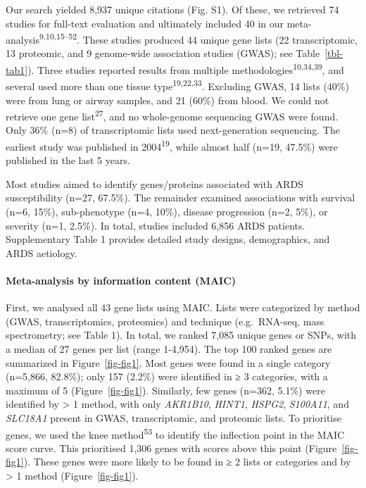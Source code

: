 \documentclass[
  11,
  a4paper,
]{article}
\let\oldparagraph\paragraph
\renewcommand{\paragraph}[1]{\oldparagraph{#1}\mbox{}}
\begin{document}
Our search yielded 8,937 unique citations (Fig. S1). Of these, we
retrieved 74 studies for full-text evaluation and ultimately included 40
in our meta-analysis\textsuperscript{9,10,15--52}. These studies
produced 44 unique gene lists (22 transcriptomic, 13 proteomic, and 9
genome-wide association studies (GWAS); see Table~\ref{tbl-tab1}). Three
studies reported results from multiple
methodologies\textsuperscript{10,34,39}, and several used more than one
tissue type\textsuperscript{19,22,33}. Excluding GWAS, 14 lists (40\%)
were from lung or airway samples, and 21 (60\%) from blood. We could not
retrieve one gene list\textsuperscript{27}, and no whole-genome
sequencing GWAS were found. Only 36\% (n=8) of transcriptomic lists used
next-generation sequencing. The earliest study was published in
2004\textsuperscript{19}, while almost half (n=19, 47.5\%) were
published in the last 5 years.

Most studies aimed to identify genes/proteins associated with ARDS
susceptibility (n=27, 67.5\%). The remainder examined associations with
survival (n=6, 15\%), sub-phenotype (n=4, 10\%), disease progression
(n=2, 5\%), or severity (n=1, 2.5\%). In total, studies included 6,856
ARDS patients. Supplementary Table 1 provides detailed study designs,
demographics, and ARDS aetiology.

\hypertarget{meta-analysis-by-information-content-maic}{%
\paragraph{Meta-analysis by information content
(MAIC)}\label{meta-analysis-by-information-content-maic}}

First, we analysed all 43 gene lists using MAIC. Lists were categorized
by method (GWAS, transcriptomics, proteomics) and technique
(e.g.~RNA-seq, mass spectrometry; see Table 1). In total, we ranked
7,085 unique genes or SNPs, with a median of 27 genes per list (range
1-4,954). The top 100 ranked genes are summarized in
Figure~\ref{fig-fig1}. Most genes were found in a single category
(n=5,866, 82.8\%); only 157 (2.2\%) were identified in ≥ 3 categories,
with a maximum of 5 (Figure~\ref{fig-fig1}). Similarly, few genes
(n=362, 5.1\%) were identified by \textgreater{} 1 method, with only
\emph{AKR1B10}, \emph{HINT1}, \emph{HSPG2}, \emph{S100A11}, and
\emph{SLC18A1} present in GWAS, transcriptomic, and proteomic lists. To
prioritise genes, we used the knee method\textsuperscript{53} to
identify the inflection point in the MAIC score curve. This prioritised
1,306 genes with scores above this point (Figure~\ref{fig-fig1}). These
genes were more likely to be found in ≥ 2 lists or categories and by
\textgreater{} 1 method (Figure~\ref{fig-fig1}).
\end{document}
